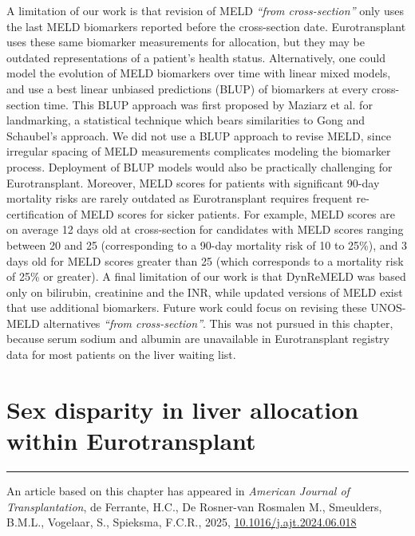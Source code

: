 \documentclass[11pt,twoside,]{book}
\begin{document}
A limitation of our work is that revision of MELD \emph{``from cross-section''}
only uses the last MELD biomarkers reported before the cross-section date.
Eurotransplant
uses these same biomarker measurements for allocation, but they may be outdated
representations of a patient's health status. Alternatively, one could
model the evolution of MELD biomarkers over time with linear mixed
models, and use a best linear unbiased
predictions (BLUP) of biomarkers at every cross-section time. This BLUP
approach was first proposed by Maziarz et al.
\citep{maziarzLongitudinalPredictionTimetoEvent2017} for landmarking, a
statistical technique which bears similarities to Gong and Schaubel's
approach. We did not use a BLUP approach to revise MELD, since irregular
spacing of MELD measurements complicates modeling the biomarker process. Deployment of BLUP models would also be practically challenging for
Eurotransplant. Moreover, MELD scores for patients with significant
90-day mortality risks are rarely outdated as Eurotransplant requires
frequent re-certification of MELD scores for sicker patients. For example,
MELD scores are on average 12 days old at cross-section for candidates with
MELD scores ranging between 20 and 25
(corresponding to a 90-day mortality risk of 10 to 25\%), and 3 days
old for MELD scores greater than 25 (which corresponds to a mortality risk of
25\% or greater).
\newpage
A final limitation of our work is that DynReMELD was based only on
bilirubin, creatinine and the INR, while updated versions of MELD exist that
use additional biomarkers. Future work could focus on revising these UNOS-MELD
alternatives \emph{``from cross-section''}. This was not pursued in this chapter,
because serum sodium and albumin are unavailable in Eurotransplant registry data
for most patients on the liver waiting list.

\FloatBarrier

\chapter{Sex disparity in liver allocation within Eurotransplant}\label{CHsexdisparity}


\vfill

\begin{center}\rule{0.5\linewidth}{0.5pt}\end{center}

\noindent
An article based on this chapter has appeared in \emph{American Journal of Transplantation}, de Ferrante, H.C., De Rosner-van Rosmalen M., Smeulders, B.M.L., Vogelaar, S., Spieksma, F.C.R., 2025, \href{https://doi.org/10.1016/j.ajt.2024.06.018}{10.1016/j.ajt.2024.06.018} \citep{deFerranteSexDisparityLiver2024}
\end{document}
